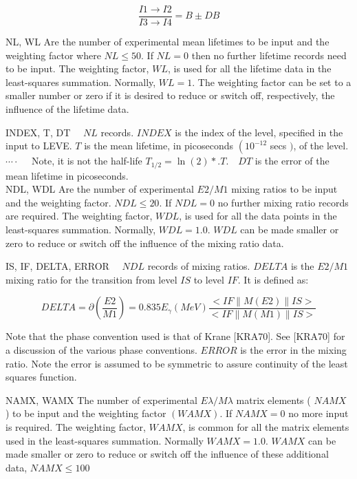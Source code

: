 \documentclass[10pt]{article}
\begin{document}
$$
\frac{I 1 \rightarrow I 2}{I 3 \rightarrow I 4}=B \pm D B
$$

NL, WL Are the number of experimental mean lifetimes to be input and the weighting factor where $N L \leq 50$. If $N L=0$ then no further lifetime records need to be input. The weighting factor, $W L$, is used for all the lifetime data in the least-squares summation. Normally, $W L=1$. The weighting factor can be set to a smaller number or zero if it is desired to reduce or switch off, respectively, the influence of the lifetime data.

INDEX, T, DT $\quad N L$ records. $I N D E X$ is the index of the level, specified in the input to LEVE. $T$ is the mean lifetime, in picoseconds $\left(10^{-12}\right.$ secs $)$, of the level.\\
$\cdots \cdot \quad$ Note, it is not the half-life $T_{1 / 2}=\ln (2) *. T . \quad D T$ is the error of the mean lifetime in picoseconds.\\
NDL, WDL Are the number of experimental $E 2 / M 1$ mixing ratios to be input and the weighting factor. $N D L \leq 20$. If $N D L=0$ no further mixing ratio records are required. The weighting factor, $W D L$, is used for all the data points in the least-squares summation. Normally, $W D L=1.0$. $W D L$ can be made smaller or zero to reduce or switch off the influence of the mixing ratio data.

IS, IF, DELTA, ERROR $\quad N D L$ records of mixing ratios. $D E L T A$ is the $E 2 / M 1$ mixing ratio for the transition from level $I S$ to level $I F$. It is defined as:

$$
D E L T A=\partial\left(\frac{E 2}{M 1}\right)=0.835 E_{\gamma}(M e V) \frac{<I F\|M(E 2)\| I S>}{<I F\|M(M 1)\| I S>}
$$

Note that the phase convention used is that of Krane [KRA70]. See [KRA70] for a discussion of the various phase conventions. $E R R O R$ is the error in the mixing ratio. Note the error is assumed to be symmetric to assure continuity of the least squares function.

NAMX, WAMX The number of experimental $E \lambda / M \lambda$ matrix elements ( $N A M X$ ) to be input and the weighting factor $(W A M X)$. If $N A M X=0$ no more input is required. The weighting factor, $W A M X$, is common for all the matrix elements used in the least-squares summation. Normally $W A M X=1.0$. $W A M X$ can be made smaller or zero to reduce or switch off the influence of these additional data, $N A M X \leq 100$
\end{document}
